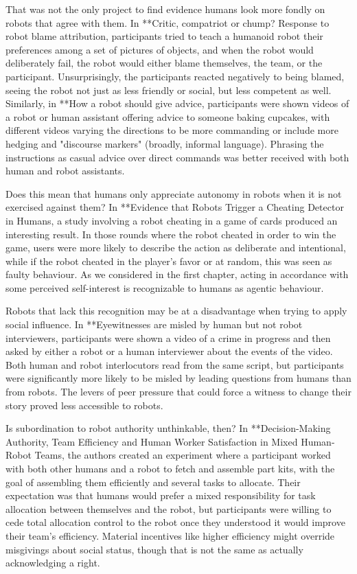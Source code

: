 \documentclass{sfuthesis}
\begin{document}
That was not the only project to find evidence humans look more fondly on robots that agree with them. In **Critic, compatriot or chump? Response to robot blame attribution, participants tried to teach a humanoid robot their preferences among a set of pictures of objects, and when the robot would deliberately fail, the robot would either blame themselves, the team, or the participant. Unsurprisingly, the participants reacted negatively to being blamed, seeing the robot not just as less friendly or social, but less competent as well. Similarly, in **How a robot should give advice, participants were shown videos of a robot or human assistant offering advice to someone baking cupcakes, with different videos varying the directions to be more commanding or include more hedging and "discourse markers" (broadly, informal language). Phrasing the instructions as casual advice over direct commands was better received with both human and robot assistants.

Does this mean that humans only appreciate autonomy in robots when it is not exercised against them? In **Evidence that Robots Trigger a Cheating Detector in Humans, a study involving a robot cheating in a game of cards produced an interesting result. In those rounds where the robot cheated in order to win the game, users were more likely to describe the action as deliberate and intentional, while if the robot cheated in the player's favor or at random, this was seen as faulty behaviour. As we considered in the first chapter, acting in accordance with some perceived self-interest is recognizable to humans as agentic behaviour.	

Robots that lack this recognition may be at a disadvantage when trying to apply social influence. In **Eyewitnesses are misled by human but not robot interviewers, participants were shown a video of a crime in progress and then asked by either a robot or a human interviewer about the events of the video. Both human and robot interlocutors read from the same script, but participants were significantly more likely to be misled by leading questions from humans than from robots. The levers of peer pressure that could force a witness to change their story proved less accessible to robots. 

Is subordination to robot authority unthinkable, then? In **Decision-Making Authority, Team Efficiency and Human Worker Satisfaction in Mixed Human-Robot Teams, the authors created an experiment where a participant worked with both other humans and a robot to fetch and assemble part kits, with the goal of assembling them efficiently and several tasks to allocate. Their expectation was that humans would prefer a mixed responsibility for task allocation between themselves and the robot, but participants were willing to cede total allocation control to the robot once they understood it would improve their team's efficiency. Material incentives like higher efficiency might override misgivings about social status, though that is not the same as actually acknowledging a right.
\end{document}
